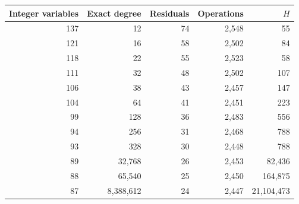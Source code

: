 \begin{center}\small
\begin{tabular}{rrrrr}
\toprule
Integer variables & Exact degree & Residuals & Operations & $H$\\
\midrule
137 & 12 & 74 & 2,548 & 55\\
121 & 16 & 58 & 2,502 & 84\\
118 & 22 & 55 & 2,523 & 58\\
111 & 32 & 48 & 2,502 & 107\\
106 & 38 & 43 & 2,457 & 147\\
104 & 64 & 41 & 2,451 & 223\\
99 & 128 & 36 & 2,483 & 556\\
94 & 256 & 31 & 2,468 & 788\\
93 & 328 & 30 & 2,448 & 788\\
89 & 32,768 & 26 & 2,453 & 82,436\\
88 & 65,540 & 25 & 2,450 & 164,875\\
87 & 8,388,612 & 24 & 2,447 & 21,104,473\\
\bottomrule
\end{tabular}
\end{center}
